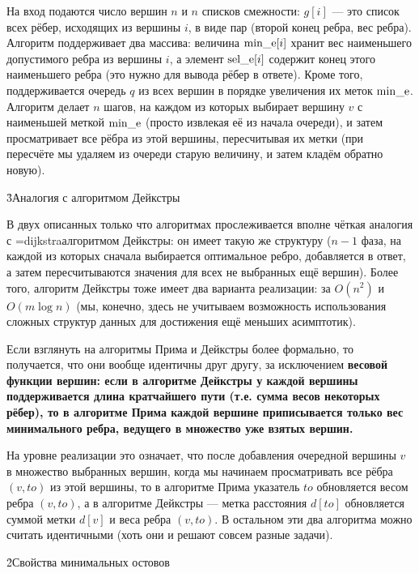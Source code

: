 На вход подаются число вершин $n$ и $n$ списков смежности: $g[i]$ --- это список всех рёбер, исходящих из вершины $i$, в виде пар (второй конец ребра, вес ребра). Алгоритм поддерживает два массива: величина ${\rm min\_e}[i]$ хранит вес наименьшего допустимого ребра из вершины $i$, а элемент ${\rm sel\_e}[i]$ содержит конец этого наименьшего ребра (это нужно для вывода рёбер в ответе). Кроме того, поддерживается очередь $q$ из всех вершин в порядке увеличения их меток ${\rm min\_e}$. Алгоритм делает $n$ шагов, на каждом из которых выбирает вершину $v$ с наименьшей меткой ${\rm min\_e}$ (просто извлекая её из начала очереди), и затем просматривает все рёбра из этой вершины, пересчитывая их метки (при пересчёте мы удаляем из очереди старую величину, и затем кладём обратно новую).


\h3{Аналогия с алгоритмом Дейкстры}

В двух описанных только что алгоритмах прослеживается вполне чёткая аналогия с \algohref=dijkstra{алгоритмом Дейкстры}: он имеет такую же структуру ($n-1$ фаза, на каждой из которых сначала выбирается оптимальное ребро, добавляется в ответ, а затем пересчитываются значения для всех не выбранных ещё вершин). Более того, алгоритм Дейкстры тоже имеет два варианта реализации: за $O(n^2)$ и $O(m \log n)$ (мы, конечно, здесь не учитываем возможность использования сложных структур данных для достижения ещё меньших асимптотик).

Если взглянуть на алгоритмы Прима и Дейкстры более формально, то получается, что они вообще идентичны друг другу, за исключением \bf{весовой функции} вершин: если в алгоритме Дейкстры у каждой вершины поддерживается длина кратчайшего пути (т.е. сумма весов некоторых рёбер), то в алгоритме Прима каждой вершине приписывается только вес минимального ребра, ведущего в множество уже взятых вершин.

На уровне реализации это означает, что после добавления очередной вершины $v$ в множество выбранных вершин, когда мы начинаем просматривать все рёбра $(v,to)$ из этой вершины, то в алгоритме Прима указатель $to$ обновляется весом ребра $(v,to)$, а в алгоритме Дейкстры --- метка расстояния $d[to]$ обновляется суммой метки $d[v]$ и веса ребра $(v,to)$. В остальном эти два алгоритма можно считать идентичными (хоть они и решают совсем разные задачи).


\h2{Свойства минимальных остовов}

